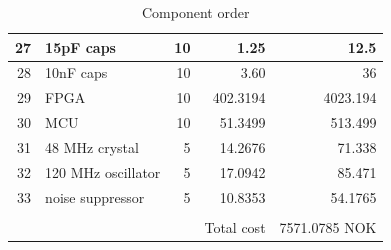 \documentclass[../main/report.tex]{subfiles}
\begin{document}
\begin{table}[h]
\begin{tabular}{| r | l | r | r | r |}
        27 & 15pF caps & 10 & 1.25 & 12.5 \\\hline
        28 & 10nF caps & 10 & 3.60 & 36 \\\hline
        29 & FPGA & 10 & 402.3194 & 4023.194 \\\hline
        30 & MCU & 10 & 51.3499 & 513.499 \\\hline
        31 & 48 MHz crystal & 5 & 14.2676 & 71.338 \\\hline
        32 & 120 MHz oscillator & 5 & 17.0942 & 85.471 \\\hline
        33 & noise suppressor & 5 & 10.8353 & 54.1765 \\\hline
         & & & & \\\hline
         & & & Total cost & 7571.0785 NOK\\\hline
    \end{tabular}
    \label{fig:component-order}
    \caption{Component order}
\end{table}
\end{document}
